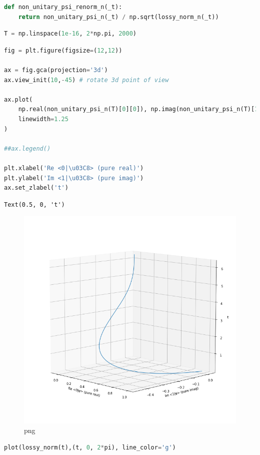 \begin{lstlisting}[language=Python]
def non_unitary_psi_renorm_n(_t):
    return non_unitary_psi_n(_t) / np.sqrt(lossy_norm_n(_t))
\end{lstlisting}

\begin{lstlisting}[language=Python]
T = np.linspace(1e-16, 2*np.pi, 2000)
\end{lstlisting}

\begin{lstlisting}[language=Python]
fig = plt.figure(figsize=(12,12))

ax = fig.gca(projection='3d')
ax.view_init(10,-45) # rotate 3d point of view

ax.plot(
    np.real(non_unitary_psi_n(T)[0][0]), np.imag(non_unitary_psi_n(T)[1][0]), T,
    linewidth=1.25
)

##ax.legend()

plt.xlabel('Re <0|\u03C8> (pure real)')
plt.ylabel('Im <1|\u03C8> (pure imag)')
ax.set_zlabel('t')
\end{lstlisting}

\begin{lstlisting}
Text(0.5, 0, 't')
\end{lstlisting}

\begin{figure}
\centering
\includegraphics[width=0.66\linewidth]{output_29_1.png}
\caption{png}
\end{figure}

\begin{lstlisting}[language=Python]
plot(lossy_norm(t),(t, 0, 2*pi), line_color='g')
\end{lstlisting}

